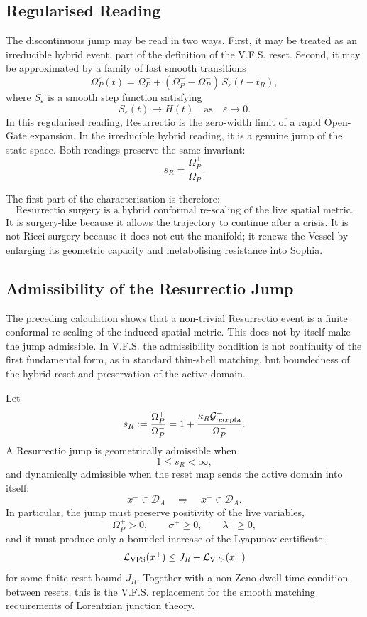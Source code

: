 \documentclass[11pt,a4paper,oneside]{book}
\theoremstyle{plain}
\theoremstyle{definition}
\theoremstyle{remark}
\begin{document}
\subsection{Regularised Reading}

The discontinuous jump may be read in two ways. First, it may be treated as an
irreducible hybrid event, part of the definition of the V.F.S. reset. Second,
it may be approximated by a family of fast smooth transitions
\[
\Omega_P^\varepsilon(t)
=
\Omega_P^-
+
(\Omega_P^+-\Omega_P^-)\,S_\varepsilon(t-t_R),
\]
where \(S_\varepsilon\) is a smooth step function satisfying
\[
S_\varepsilon(t)\to H(t)
\quad
\text{as}
\quad
\varepsilon\to0.
\]
In this regularised reading, Resurrectio is the zero-width limit of a rapid
Open-Gate expansion. In the irreducible hybrid reading, it is a genuine jump
of the state space. Both readings preserve the same invariant:
\[
s_R=\frac{\Omega_P^+}{\Omega_P^-}.
\]

The first part of the characterisation is therefore:
\[
\boxed{
\text{Resurrectio surgery is a hybrid conformal re-scaling of the live spatial metric.}
}
\]
It is surgery-like because it allows the trajectory to continue after a crisis.
It is not Ricci surgery because it does not cut the manifold; it renews the
Vessel by enlarging its geometric capacity and metabolising resistance into
Sophia.

\subsection{Admissibility of the Resurrectio Jump}

The preceding calculation shows that a non-trivial Resurrectio event is a
finite conformal re-scaling of the induced spatial metric. This does not by
itself make the jump admissible. In V.F.S. the admissibility condition is not
continuity of the first fundamental form, as in standard thin-shell matching,
but boundedness of the hybrid reset and preservation of the active domain.

Let
\[
s_R:=\frac{\Omega_P^+}{\Omega_P^-}
=
1+\frac{\kappa_R\mathcal G^-_{\rm recepta}}{\Omega_P^-}.
\]
A Resurrectio jump is geometrically admissible when
\[
1\le s_R<\infty,
\]
and dynamically admissible when the reset map sends the active domain into
itself:
\[
x^-\in \mathcal D_A
\quad\Longrightarrow\quad
x^+\in \mathcal D_A.
\]
In particular, the jump must preserve positivity of the live variables,
\[
\Omega_P^+>0,
\qquad
\sigma^+\ge 0,
\qquad
\lambda^+\ge 0,
\]
and it must produce only a bounded increase of the Lyapunov certificate:
\[
\mathcal L_{\rm VFS}(x^+)
\le
J_R+\mathcal L_{\rm VFS}(x^-)
\]
for some finite reset bound \(J_R\). Together with a non-Zeno dwell-time
condition between resets, this is the V.F.S. replacement for the smooth
matching requirements of Lorentzian junction theory.
\end{document}
